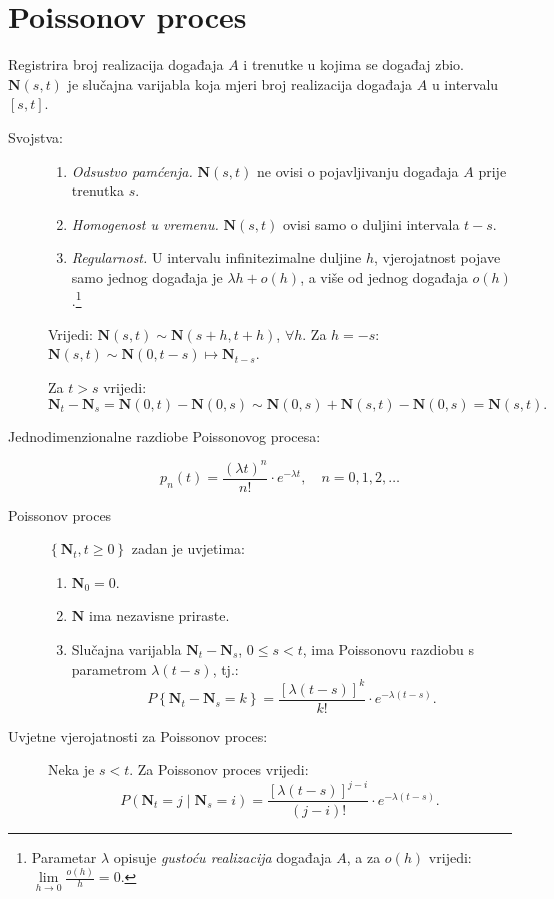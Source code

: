 \documentclass[12pt,english]{article}
\newcommand{\N}{\mathbf N}
\begin{document}
\section{Poissonov proces}
Registrira broj realizacija događaja $A$ i trenutke u kojima se događaj zbio.
$\mathbf N(s,t)$ je slučajna varijabla koja mjeri broj realizacija događaja $A$ u intervalu $[s,t]$.

\begin{description}
  \item[Svojstva:]\hfill
    \begin{enumerate}
      \item \emph{Odsustvo pamćenja.} $\mathbf N(s,t)$ ne ovisi o pojavljivanju događaja $A$ prije trenutka $s$.
      \item \emph{Homogenost u vremenu.} $\mathbf N(s,t)$ ovisi samo o duljini intervala $t-s$.
      \item \emph{Regularnost.} U intervalu infinitezimalne duljine $h$, vjerojatnost pojave samo jednog događaja je $\lambda h + o(h)$, a više od jednog događaja $o(h)$.\footnote{Parametar $\lambda$ opisuje \emph{gustoću realizacija} događaja $A$, a za $o(h)$ vrijedi: $\lim\limits_{h\rightarrow 0} \frac{o(h)}{h} = 0$.}
    \end{enumerate}
  Vrijedi: $\mathbf N(s,t) \sim \mathbf N(s+h,t+h)$, $\forall h$. Za $h=-s$: $\mathbf N(s,t) \sim \mathbf N(0,t-s) \mapsto \mathbf N_{t-s}$.

  Za $t>s$ vrijedi:
  $\N_t - \N_s = \N(0,t) - \N(0,s) \sim \N(0,s)+\N(s,t)-\N(0,s) = \N(s,t).$

  \item[Jednodimenzionalne razdiobe Poissonovog procesa:]
  $$p_n(t) = \frac{(\lambda t)^n}{n!}\cdot e^{-\lambda t}, \quad n = 0,1,2,\ldots$$
  \item[Poissonov proces] $\left\{ \N_t, t \geq 0\right\}$ zadan je uvjetima:
  \begin{enumerate}
    \item $\N_0 = 0$.
    \item $\N$ ima nezavisne priraste.
    \item Slučajna varijabla $\N_t-\N_s$, $0 \leq s < t$, ima Poissonovu razdiobu s parametrom $\lambda(t-s)$, tj.:
    $$P\left\{\N_t-\N_s = k\right\} = \frac{\left[ \lambda(t-s)\right]^k}{k!}\cdot e^{-\lambda (t-s)}.$$
  \end{enumerate}

  \item[Uvjetne vjerojatnosti za Poissonov proces:] Neka je $s<t$. Za Poissonov proces vrijedi:
  $$P(\N_t = j\; \vert \; \N_s = i) = \frac{\left[\lambda(t-s)\right]^{j-i}}{(j-i)!}\cdot e^{-\lambda(t-s)}.$$


\end{description}
\end{document}
